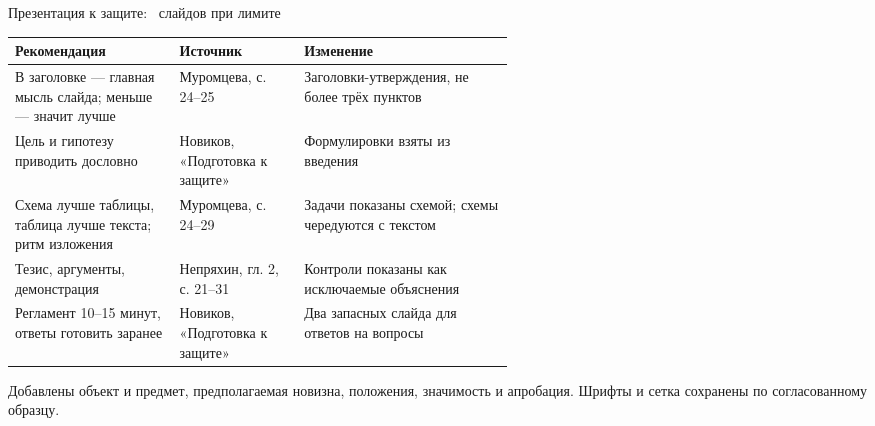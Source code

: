 \begin{frame}{Презентация к защите: \ProgDefenceSlides\ слайдов при лимите \ProgDefenceLimit}
{\ProgDense
\begin{tabularx}{\linewidth}{|L{0.33\linewidth}|L{0.25\linewidth}|Y|}
\hline Рекомендация & Источник & Изменение \\\hline
В заголовке --- главная мысль слайда; меньше --- значит лучше & Муромцева, с. 24--25 & Заголовки-утверждения, не более трёх пунктов \\\hline
Цель и гипотезу приводить дословно & Новиков, «Подготовка к защите» & Формулировки взяты из введения \\\hline
Схема лучше таблицы, таблица лучше текста; ритм изложения & Муромцева, с. 24--29 & Задачи показаны схемой; схемы чередуются с текстом \\\hline
Тезис, аргументы, демонстрация & Непряхин, гл. 2, с. 21--31 & Контроли показаны как исключаемые объяснения \\\hline
Регламент 10--15 минут, ответы готовить заранее & Новиков, «Подготовка к защите» & Два запасных слайда для ответов на вопросы \\\hline
\end{tabularx}\par}
\SlideGap
Добавлены объект и предмет, предполагаемая новизна, положения, значимость и апробация. Шрифты и сетка сохранены по согласованному образцу.
\end{frame}
